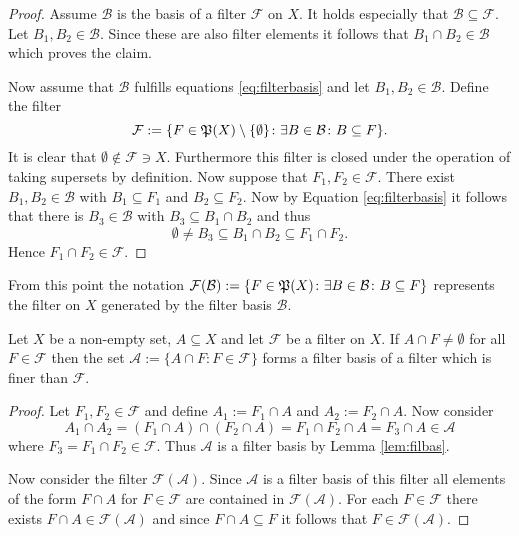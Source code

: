 \begin{proof}
  Assume $\mathcal{B}$ is the basis of a filter $\mathcal{F}$ on $X$. It holds especially that $\mathcal{B} \subseteq \mathcal{F}$. Let $B_1, B_2 \in \mathcal{B}$. Since these are also filter elements it follows that $B_1 \cap B_2 \in \mathcal{B}$ which proves the claim.

  Now assume that $\mathcal{B}$ fulfills equations \ref{eq:filterbasis} and let $B_1, B_2 \in \mathcal{B}$. Define the filter \[\mathcal{F} := \{ F \in \mathfrak{P}(X)\setminus\{ \emptyset \}\colon \exists B\in\mathcal{B}\colon B \subseteq F \}.\] It is clear that $\emptyset \notin \mathcal{F} \ni X$. Furthermore this filter is closed under the operation of taking supersets by definition. Now suppose that $F_1, F_2 \in \mathcal{F}$. There exist $B_1, B_2 \in \mathcal{B}$ with $B_1 \subseteq F_1$ and $B_2 \subseteq F_2$. Now by Equation \ref{eq:filterbasis} it follows that there is $B_3 \in \mathcal{B}$ with $B_3 \subseteq B_1 \cap B_2$ and thus
  \begin{equation*}
    \emptyset \neq B_3 \subseteq B_1 \cap B_2 \subseteq F_1 \cap F_2.
  \end{equation*}
  Hence $F_1 \cap F_2 \in \mathcal{F}$.
\end{proof}

From this point the notation $\mathcal{F}(\mathcal{B}) := \{F \in \mathfrak{P}(X) \colon \exists B\in\mathcal{B}\colon B\subseteq F\}$ represents the filter on $X$ generated by the filter basis $\mathcal{B}$.

\begin{col}\label{cor:filbas}
  Let $X$ be a non-empty set, $A \subseteq X$ and let $\mathcal{F}$ be a filter on $X$. If $A \cap F \neq \emptyset$ for all $F\in\mathcal{F}$ then the set $\mathcal{A} := \{A \cap F\colon F\in \mathcal{F}\}$ forms a filter basis of a filter which is finer than $\mathcal{F}$.
\end{col}

\begin{proof}
  Let $F_1, F_2 \in \mathcal{F}$ and define $A_1 := F_1 \cap A$ and $A_2 := F_2 \cap A$. Now consider
  \begin{equation*}
    A_1 \cap A_2 = (F_1 \cap A) \cap (F_2 \cap A) = F_1 \cap F_2 \cap A = F_3 \cap A \in \mathcal{A}
  \end{equation*}
  where $F_3 = F_1 \cap F_2 \in \mathcal{F}$. Thus $\mathcal{A}$ is a filter basis by Lemma \ref{lem:filbas}.

  Now consider the filter $\mathcal{F}(\mathcal{A})$. Since $\mathcal{A}$ is a filter basis of this filter all elements of the form $F \cap A$ for $F\in\mathcal{F}$ are contained in $\mathcal{F}(\mathcal{A})$. For each $F\in\mathcal{F}$ there exists $F\cap A\in \mathcal{F}(\mathcal{A})$ and since $F\cap A \subseteq F$ it follows that $F\in \mathcal{F}(\mathcal{A})$. 
\end{proof}

